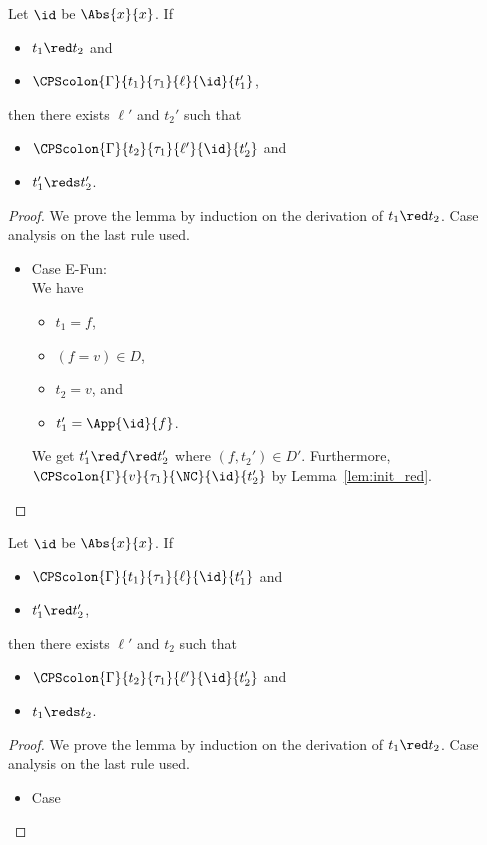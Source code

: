 \newpage
\begin{lemma}
\label{lem:cps_sim}
Let $\id$ be $\Abs{x}{x}$.  If
\begin{itemize}
\item $t_1 \red t_2$ and
\item $\CPScolon{\Gamma}{t_1}{\tau_1}{\ell}{\id}{t_1'}$,
\end{itemize}
then there exists $\ell'$ and $t_2'$ such that
\begin{itemize}
\item $\CPScolon{\Gamma}{t_2}{\tau_1}{\ell'}{\id}{t_2'}$ and
\item $t_1' \reds t_2'$.
\end{itemize}
\end{lemma}
\begin{proof}
We prove the lemma by induction on the derivation of $t_1 \red t_2$.
Case analysis on the last rule used.
\begin{itemize}
\item Case E-Fun: \\
      We have
      \begin{itemize}
       \item $t_1 = f$,
       \item $(f = v) \in D$,
       \item $t_2 = v$, and
       \item $t_1' = \App{\id}{f}$.
      \end{itemize}
      We get $t_1' \red f \red t_2'$ where $(f, t_2') \in D'$.
      Furthermore, $\CPScolon{\Gamma}{v}{\tau_1}{\NC}{\id}{t_2'}$
      by Lemma~\ref{lem:init_red}.
\end{itemize}
\end{proof}


\begin{lemma}
\label{lem:cps_sim_inv}
Let $\id$ be $\Abs{x}{x}$.  If
\begin{itemize}
\item $\CPScolon{\Gamma}{t_1}{\tau_1}{\ell}{\id}{t_1'}$ and
\item $t_1' \red t_2'$,
\end{itemize}
then there exists $\ell'$ and $t_2$ such that
\begin{itemize}
\item $\CPScolon{\Gamma}{t_2}{\tau_1}{\ell'}{\id}{t_2'}$ and
\item $t_1 \reds t_2$.
\end{itemize}
\end{lemma}
\begin{proof}
We prove the lemma by induction on the derivation of $t_1 \red t_2$.
Case analysis on the last rule used.
\begin{itemize}
\item Case
\end{itemize}
\end{proof}


